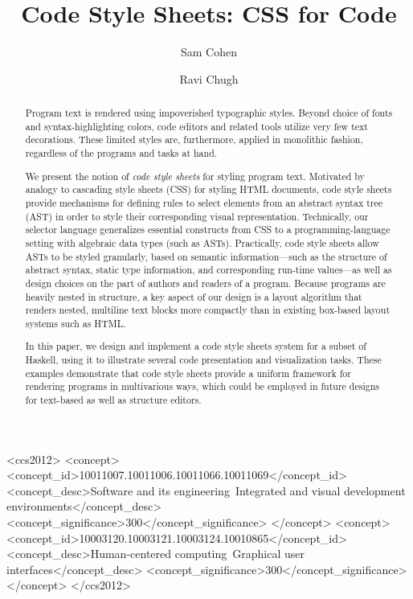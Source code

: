 \documentclass[acmsmall, screen]{acmart}
\begin{document}
\title[Code Style Sheets]{Code Style Sheets: CSS for Code}

\author{Sam Cohen}
\author{Ravi Chugh}



\begin{abstract}

Program text is rendered using impoverished typographic styles.
Beyond choice of fonts and syntax-highlighting colors, code editors and related tools utilize very few text decorations.
These limited styles are, furthermore, applied in monolithic fashion, regardless of the programs and tasks at hand.

We present the notion of \emph{code style sheets} for styling program text. Motivated by analogy to cascading style sheets (CSS) for styling HTML documents, code style sheets provide mechanisms
for defining rules to select elements from an abstract syntax tree (AST) in order to style their corresponding visual representation.
Technically, our selector language generalizes essential constructs from CSS to a programming-language setting with algebraic data types (such as ASTs).
Practically, code style sheets allow ASTs to be styled granularly, based on semantic information---such as the structure of abstract syntax, static type information, and corresponding run-time values---as well as design choices on the part of authors and readers of a program.
Because programs are heavily nested in structure, a key aspect of our design is a layout algorithm that renders nested, multiline text blocks more compactly than in existing box-based layout systems such as HTML.


In this paper, we design and implement a code style sheets system for a subset of Haskell,
using it to illustrate several code presentation and visualization tasks.
These examples demonstrate that code style sheets provide a uniform framework for rendering programs in multivarious ways, which could be employed in future designs for text-based as well as structure editors.

\end{abstract}
 
\begin{CCSXML}
<ccs2012>
  <concept>
    <concept_id>10011007.10011006.10011066.10011069</concept_id>
    <concept_desc>Software and its engineering~Integrated and visual development environments</concept_desc>
    <concept_significance>300</concept_significance>
  </concept>
  <concept>
    <concept_id>10003120.10003121.10003124.10010865</concept_id>
    <concept_desc>Human-centered computing~Graphical user interfaces</concept_desc>
    <concept_significance>300</concept_significance>
  </concept>
</ccs2012>
\end{CCSXML}
\end{document}
